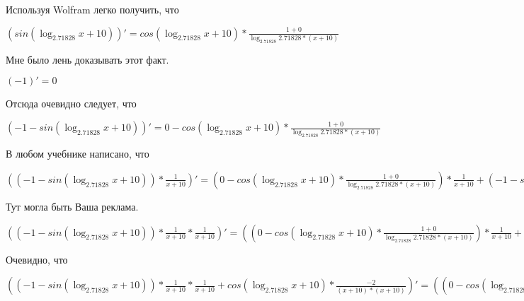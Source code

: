 \documentclass[12pt,a4paper,fleqn]{article}
\theoremstyle{definition}
\begin{document}
Используя Wolfram легко получить, что

$(sin(\log_{ 2.71828 }{ x  +  10 }))' = cos(\log_{ 2.71828 }{ x  +  10 }) * \frac{ 1  +  0 }{\log_{ 2.71828 }{ 2.71828 } * ( x  +  10 )}
$

Мне было лень доказывать этот факт.

$( -1 )' =  0 $

Отсюда очевидно следует, что

$( -1  - sin(\log_{ 2.71828 }{ x  +  10 }))' =  0  - cos(\log_{ 2.71828 }{ x  +  10 }) * \frac{ 1  +  0 }{\log_{ 2.71828 }{ 2.71828 } * ( x  +  10 )}
$

В любом учебнике написано, что

$(( -1  - sin(\log_{ 2.71828 }{ x  +  10 })) * \frac{ 1 }{ x  +  10 }
)' = ( 0  - cos(\log_{ 2.71828 }{ x  +  10 }) * \frac{ 1  +  0 }{\log_{ 2.71828 }{ 2.71828 } * ( x  +  10 )}
) * \frac{ 1 }{ x  +  10 }
 + ( -1  - sin(\log_{ 2.71828 }{ x  +  10 })) * \frac{ 0  * ( x  +  10 ) -  1  * ( 1  +  0 )}{( x  +  10 ) * ( x  +  10 )}
$

Тут могла быть Ваша реклама.

$(( -1  - sin(\log_{ 2.71828 }{ x  +  10 })) * \frac{ 1 }{ x  +  10 }
 * \frac{ 1 }{ x  +  10 }
)' = (( 0  - cos(\log_{ 2.71828 }{ x  +  10 }) * \frac{ 1  +  0 }{\log_{ 2.71828 }{ 2.71828 } * ( x  +  10 )}
) * \frac{ 1 }{ x  +  10 }
 + ( -1  - sin(\log_{ 2.71828 }{ x  +  10 })) * \frac{ 0  * ( x  +  10 ) -  1  * ( 1  +  0 )}{( x  +  10 ) * ( x  +  10 )}
) * \frac{ 1 }{ x  +  10 }
 + ( -1  - sin(\log_{ 2.71828 }{ x  +  10 })) * \frac{ 1 }{ x  +  10 }
 * \frac{ 0  * ( x  +  10 ) -  1  * ( 1  +  0 )}{( x  +  10 ) * ( x  +  10 )}
$

Очевидно, что

$(( -1  - sin(\log_{ 2.71828 }{ x  +  10 })) * \frac{ 1 }{ x  +  10 }
 * \frac{ 1 }{ x  +  10 }
 + cos(\log_{ 2.71828 }{ x  +  10 }) * \frac{ -2 }{( x  +  10 ) * ( x  +  10 )}
)' = (( 0  - cos(\log_{ 2.71828 }{ x  +  10 }) * \frac{ 1  +  0 }{\log_{ 2.71828 }{ 2.71828 } * ( x  +  10 )}
) * \frac{ 1 }{ x  +  10 }
 + ( -1  - sin(\log_{ 2.71828 }{ x  +  10 })) * \frac{ 0  * ( x  +  10 ) -  1  * ( 1  +  0 )}{( x  +  10 ) * ( x  +  10 )}
) * \frac{ 1 }{ x  +  10 }
 + ( -1  - sin(\log_{ 2.71828 }{ x  +  10 })) * \frac{ 1 }{ x  +  10 }
 * \frac{ 0  * ( x  +  10 ) -  1  * ( 1  +  0 )}{( x  +  10 ) * ( x  +  10 )}
 + ( -1  - sin(\log_{ 2.71828 }{ x  +  10 })) * \frac{ 1  +  0 }{\log_{ 2.71828 }{ 2.71828 } * ( x  +  10 )}
 * \frac{ -2 }{( x  +  10 ) * ( x  +  10 )}
 + cos(\log_{ 2.71828 }{ x  +  10 }) * \frac{ 0  * ( x  +  10 ) * ( x  +  10 ) -  -2  * (( 1  +  0 ) * ( x  +  10 ) + ( x  +  10 ) * ( 1  +  0 ))}{( x  +  10 ) * ( x  +  10 ) * ( x  +  10 ) * ( x  +  10 )}
$
\end{document}
